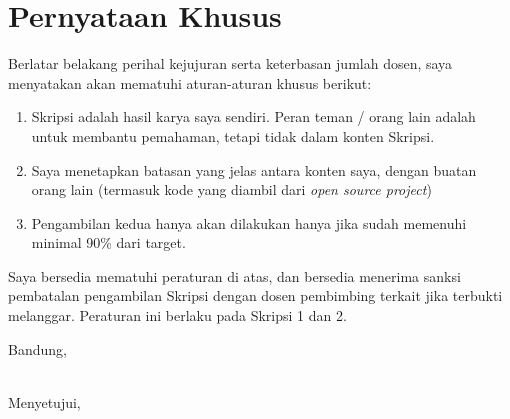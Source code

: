 \documentclass[a4paper,twoside]{article}
\begin{document}
\section{Pernyataan Khusus}
Berlatar belakang perihal kejujuran serta keterbasan jumlah dosen, saya menyatakan akan mematuhi aturan-aturan khusus berikut:
\begin{enumerate}
	\item Skripsi adalah hasil karya saya sendiri. Peran teman / orang lain adalah untuk membantu pemahaman, tetapi tidak dalam konten Skripsi.
	\item Saya menetapkan batasan yang jelas antara konten saya, dengan buatan orang lain (termasuk kode yang diambil dari {\it open source project})
	\item Pengambilan kedua hanya akan dilakukan hanya jika sudah memenuhi minimal 90\% dari target.
\end{enumerate}
Saya bersedia mematuhi peraturan di atas, dan bersedia menerima sanksi pembatalan pengambilan Skripsi dengan dosen pembimbing terkait jika terbukti melanggar. Peraturan ini berlaku pada Skripsi 1 dan 2.

\vspace{1.5cm}

\centering Bandung, \tanggal\\
\vspace{2cm} \nama \\
\vspace{1cm}

Menyetujui, \\
\end{document}
